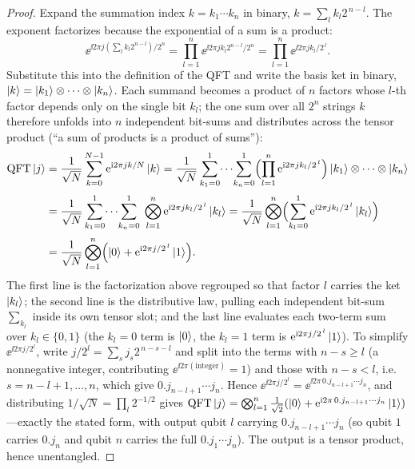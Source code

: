 \begin{proof}
Expand the summation index $k=k_1\cdots k_n$ in binary, $k=\sum_l k_l 2^{\,n-l}$.
The exponent factorizes because the exponential of a sum is a product:
\[
  \ee^{\ii 2\pi j(\sum_l k_l 2^{n-l})/2^{n}}
   =\prod_{l=1}^{n}\ee^{\ii 2\pi j k_l 2^{n-l}/2^{n}}
   =\prod_{l=1}^{n}\ee^{\ii 2\pi j k_l/2^{\,l}}.
\]
Substitute this into the definition of the QFT and write the basis ket in binary,
$\ket{k}=\ket{k_1}\otimes\cdots\otimes\ket{k_n}$. Each summand becomes a product of
$n$ factors whose $l$-th factor depends only on the single bit $k_l$; the one sum
over all $2^{n}$ strings $k$ therefore unfolds into $n$ independent bit-sums and
distributes across the tensor product (``a sum of products is a product of sums''):
\[
\begin{aligned}
  \mathrm{QFT}\ket{j}
   &=\frac{1}{\sqrt N}\sum_{k=0}^{N-1}\mathrm{e}^{\mathrm{i} 2\pi jk/N}\ket{k}
    =\frac{1}{\sqrt N}\sum_{k_1=0}^{1}\!\cdots\!\sum_{k_n=0}^{1}
       \Bigl(\prod_{l=1}^{n}\mathrm{e}^{\mathrm{i} 2\pi j k_l/2^{\,l}}\Bigr)
       \ket{k_1}\otimes\cdots\otimes\ket{k_n}\\[2pt]
   &=\frac{1}{\sqrt N}\sum_{k_1=0}^{1}\!\cdots\!\sum_{k_n=0}^{1}\;
       \bigotimes_{l=1}^{n}\mathrm{e}^{\mathrm{i} 2\pi j k_l/2^{\,l}}\ket{k_l}
    =\frac{1}{\sqrt N}\bigotimes_{l=1}^{n}
       \Bigl(\sum_{k_l=0}^{1}\mathrm{e}^{\mathrm{i} 2\pi j k_l/2^{\,l}}\ket{k_l}\Bigr)\\[2pt]
   &=\frac{1}{\sqrt N}\bigotimes_{l=1}^{n}
       \Bigl(\ket{0}+\mathrm{e}^{\mathrm{i} 2\pi j/2^{\,l}}\ket{1}\Bigr).
\end{aligned}
\]
The first line is the factorization above regrouped so that factor $l$ carries the
ket $\ket{k_l}$; the second line is the distributive law, pulling each independent
bit-sum $\sum_{k_l}$ inside its own tensor slot; and the last line evaluates each
two-term sum over $k_l\in\{0,1\}$ (the $k_l=0$ term is $\ket{0}$, the $k_l=1$ term is
$\mathrm{e}^{\mathrm{i} 2\pi j/2^{\,l}}\ket{1}$).
To simplify $\ee^{\ii 2\pi j/2^{l}}$, write $j/2^{l}=\sum_{s}j_s 2^{\,n-s-l}$ and
split into the terms with $n-s\ge l$ (a nonnegative integer, contributing
$\ee^{\ii 2\pi(\text{integer})}=1$) and those with $n-s<l$, i.e.\
$s=n-l+1,\dots,n$, which give $0.j_{n-l+1}\cdots j_n$. Hence
$\ee^{\ii 2\pi j/2^{l}}=\ee^{\ii 2\pi\,0.j_{n-l+1}\cdots j_n}$, and distributing
$1/\sqrt N=\prod_l 2^{-1/2}$ gives
$\mathrm{QFT}\ket{j}=\bigotimes_{l=1}^{n}\tfrac{1}{\sqrt2}(\ket{0}
+\mathrm{e}^{\mathrm{i} 2\pi\,0.j_{n-l+1}\cdots j_n}\ket{1})$---exactly the stated form, with output
qubit $l$ carrying $0.j_{n-l+1}\cdots j_n$ (so qubit $1$ carries $0.j_n$ and qubit $n$
carries the full $0.j_1\cdots j_n$). The output is a tensor product, hence
unentangled.
\end{proof}

